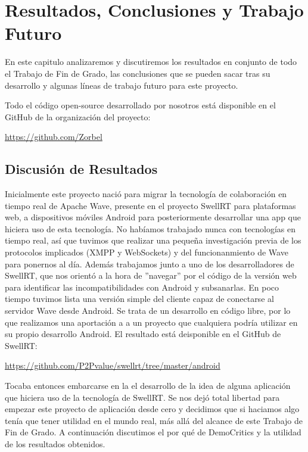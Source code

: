 \newpage
\thispagestyle{sectioned}
\chapter{Resultados, Conclusiones y Trabajo Futuro}

En este capitulo analizaremos y discutiremos los resultados en conjunto de todo el Trabajo de Fin de Grado, las conclusiones que se pueden sacar tras su desarrollo y algunas líneas de trabajo futuro para este proyecto.

Todo el código open-source desarrollado por nosotros está disponible en el GitHub de la organización del proyecto:

\url{https://github.com/Zorbel}

\section{Discusión de Resultados}

Inicialmente este proyecto nació para migrar la tecnología de colaboración en tiempo real de Apache Wave, presente en el proyecto SwellRT para plataformas web, a dispositivos móviles Android para posteriormente desarrollar una app que hiciera uso de esta tecnología. No habíamos trabajado nunca con tecnologías en tiempo real, así que tuvimos que realizar una pequeña investigación previa de los protocolos implicados (XMPP y WebSockets) y del funcionanmiento de Wave para ponernos al día. Además trabajamos junto a uno de los desarrolladores de SwellRT, que nos orientó a la hora de ''navegar'' por el código de la versión web para identificar las incompatibilidades con Android y subsanarlas. En poco tiempo tuvimos lista una versión simple del cliente capaz de conectarse al servidor Wave desde Android. Se trata de un desarrollo en código libre, por lo que realizamos una aportación a a un proyecto que cualquiera podría utilizar en su propio desarrollo Android. El resultado está deisponible en el GitHub de SwellRT:

\url{https://github.com/P2Pvalue/swellrt/tree/master/android}

Tocaba entonces embarcarse en la el desarrollo de la idea de alguna aplicación que hiciera uso de la tecnología de SwellRT. Se nos dejó total libertad para empezar este proyecto de aplicación desde cero y decidimos que si haciamos algo tenía que tener utilidad en el mundo real, más allá del alcance de este Trabajo de Fin de Grado. A continuación discutimos el por qué de DemoCritics y la utilidad de los resultados obtenidos. 


